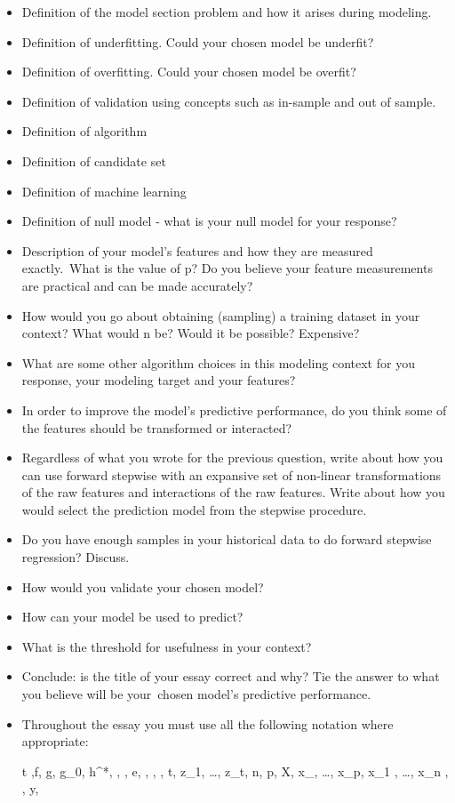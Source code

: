 \documentclass[12pt]{article}
\begin{document}
\begin{itemize}
\item Definition of the model section problem and how it arises during modeling.
\item Definition of underfitting. Could your chosen model be underfit?
\item Definition of overfitting. Could your chosen model be overfit?
\item Definition of validation using concepts such as in-sample and out of sample.
\item Definition of algorithm 
\item Definition of candidate set
\item Definition of machine learning
\item Definition of null model - what is your null model for your response?


\item Description of your model's features and how they are measured exactly. What is the value of p? Do you believe your feature measurements are practical and can be made accurately?
\item How would you go about obtaining (sampling) a training dataset in your context? What would n be? Would it be possible? Expensive?
\item What are some other algorithm choices in this modeling context for you response, your modeling target and your features?

\item In order to improve the model's predictive performance, do you think some of the features should be transformed or interacted?


\item Regardless of what you wrote for the previous question, write about how you can use forward stepwise with an expansive set of non-linear transformations of the raw features and interactions of the raw features.  Write about how you would select the prediction model from the stepwise procedure.

\item Do you have enough samples in your historical data to do forward stepwise regression? Discuss.
\item How would you validate your chosen model?

\item How can your model be used to predict?



\item What is the threshold for usefulness in your context?
\item Conclude: is the title of your essay correct and why? Tie the answer to what you believe will be your chosen model's predictive performance.

\item Throughout the essay you must use all the following notation where appropriate:

\beqn
t ,f, g, g_0, h^*, \delta, , e, , , , t, z_1, \ldots, z_t, n, p, X, x_{}, \ldots, x_{\cdot p}, x_{1 \cdot}, \ldots, x_{n \cdot}, , y, 
\eeqn
\end{itemize}
\end{document}
